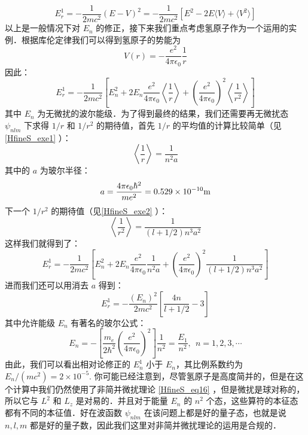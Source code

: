 \begin{equation}
E_r^1=-\frac{1}{2mc^2}(E-V)^2=-\frac{1}{2mc^2}[E^2-2E\langle V\rangle+\langle V^2\rangle]
\end{equation}
以上是一般情况下对 $E_n$ 的修正，接下来我们重点考虑氢原子作为一个运用的实例．根据库伦定律我们可以得到氢原子的势能为
\begin{equation}
V(r)=-\frac{e^2}{4\pi\epsilon_0}\frac{1}{r}
\end{equation}
因此：
\begin{equation}
E_r^1=-\frac{1}{2mc^2}\left[E_n^2+2E_n\frac{e^2}{4\pi\epsilon_0}\left\langle \frac{1}{r}\right\rangle+\left(\frac{e^2}{4\pi\epsilon_0}\right)^2\left\langle \frac{1}{r^2}\right\rangle\right]
\end{equation}
其中 $E_n$ 为无微扰的波尔能级．为了得到最终的结果，我们还需要再无微扰态 $\psi_{nlm}$ 下求得 $1/r$ 和 $1/r^2$ 的期待值，首先 $1/r$ 的平均值的计算比较简单（见\autoref{HfineS_exe1} ）：
\begin{equation}
\left\langle\frac{1}{r}\right\rangle = \frac{1}{n^2a}
\end{equation}
其中的 $a$ 为玻尔半径：
\begin{equation}
a=\frac{4\pi\epsilon_0\hbar^2}{me^2}=0.529\times 10^{-10}\rm{m}
\end{equation}
下一个 $1/r^2$ 的期待值（见\autoref{HfineS_exe2} ）：
\begin{equation}
\left\langle \frac{1}{r^2}\right\rangle = \frac{1}{(l+1/2)n^3a^2}
\end{equation}
这样我们就得到了：
\begin{equation}
E_r^1=-\frac{1}{2mc^2}\left[E_n^2+2E_n\frac{e^2}{4\pi\epsilon_0}\frac{1}{n^2a}+\left(\frac{e^2}{4\pi\epsilon_0}\right)^2\frac{1}{(l+1/2)n^3a^2}\right]
\end{equation}
进而我们还可以用消去 $a$ 得到：
\begin{equation}\label{HfineS_eq21}
E_r^1=-\frac{(E_n)^2}{2mc^2}\left[\frac{4n}{l+1/2}-3\right]
\end{equation}
其中允许能级 $E_n$ 有著名的玻尔公式：
\begin{equation}
E_{n} =-\left[\frac {m_e}{2\hbar^{2}} \left(\frac {e^ {2}}{4\pi \epsilon_0}\right)^ {2}\right]  \frac {1}{n^ {2}}  =  \frac {E_ {1}}{n^ {2}}, \ \  n=1,2,3, \cdots 
\end{equation}
由此，我们可以看出相对论修正的 $E^1_n$ 小于 $E_n$，其比例系数约为 $E_n/(mc^2)=2\times 10^{-5}$.
你可能已经注意到，尽管氢原子是高度简并的，但是在这个计算中我们仍然使用了非简并微扰理论 \autoref{HfineS_eq16} ，但是微扰是球对称的，所以它与 $L^2$ 和 $L_z$ 是对易的．并且对于能量 $E_n$ 的 $n^2$ 个态，这些算符的本征态都有不同的本征值．好在波函数 $\psi_{nlm}$ 在该问题上都是好的量子态，也就是说 $n,l,m$ 都是好的量子数，因此我们这里对非简并微扰理论的运用是合规的．

